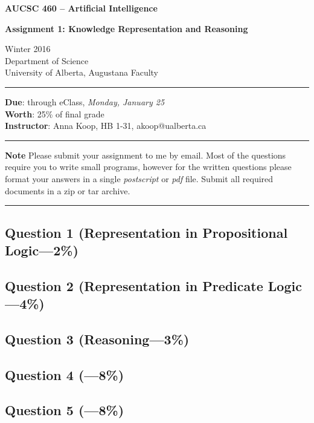 \documentclass[12pt]{article}
\begin{document}
\noindent
{\Large\bf AUCSC 460 -- Artificial Intelligence}

\vspace*{1\baselineskip}

\noindent
{\large\bf Assignment 1: Knowledge Representation and Reasoning}

\vspace*{1\baselineskip}

\noindent
Winter 2016\\
Department of Science\\
University of Alberta, Augustana Faculty

\vspace*{1.75\baselineskip}
\hrule

\vspace*{0.75\baselineskip}

\noindent
{\bf Due}: through eClass, {\em Monday, January 25}\\
{\bf Worth}: 25\% of final grade
\\
{\bf Instructor}: Anna Koop, HB 1-31, akoop@ualberta.ca

\vspace*{0.75\baselineskip}

\hrule

\vspace*{1\baselineskip}

\noindent
{\bf Note}
Please submit your assignment to me by email.
Most of the questions require you to write small programs,
however for the written questions please format your answers
in a single {\em postscript\/} or {\em pdf\/} file.
Submit all required documents in a zip or tar archive.


\vspace*{1\baselineskip}

\hrule


\subsection*{Question 1 \rm(Representation in Propositional Logic---2\%)}


\subsection*{Question 2 \rm(Representation in Predicate Logic---4\%)}

\subsection*{Question 3 \rm(Reasoning---3\%)}

\subsection*{Question 4 \rm(---8\%)}

\subsection*{Question 5 \rm(---8\%)}
\end{document}
